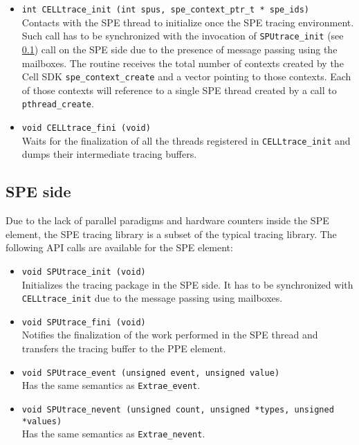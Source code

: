 \begin{itemize}

 \item {\tt int  CELLtrace\_init (int spus, spe\_context\_ptr\_t * spe\_ids)}\\
 Contacts with the SPE thread to initialize once the SPE tracing environment. Such call has to be synchronized with the invocation of {\tt SPUtrace\_init} (see \ref{subsec:SPEside}) call on the SPE side due to the presence of message passing using the mailboxes. The routine receives the total number of contexts created by the Cell SDK {\tt spe\_context\_create} and a vector pointing to those contexts. Each of those contexts will reference to a single SPE thread created by a call to {\tt pthread\_create}.

 \item {\tt void CELLtrace\_fini (void)}\\
 Waits for the finalization of all the threads registered in {\tt CELLtrace\_init} and dumps their intermediate tracing buffers.

\end{itemize}

\subsection{SPE side}\label{subsec:SPEside}

Due to the lack of parallel paradigms and hardware counters inside the SPE element, the SPE tracing library is a subset of the typical tracing library. The following API calls are available for the SPE element:

\begin{itemize}

 \item {\tt void SPUtrace\_init (void)}\\
 Initializes the tracing package in the SPE side. It has to be synchronized with {\tt CELLtrace\_init} due to the message passing using mailboxes.

 \item {\tt void SPUtrace\_fini (void)}\\
 Notifies the finalization of the work performed in the SPE thread and transfers the tracing buffer to the PPE element.

 \item {\tt void SPUtrace\_event (unsigned event, unsigned value)}\\
 Has the same semantics as {\tt Extrae\_event}.

 \item {\tt void SPUtrace\_nevent (unsigned count, unsigned *types, unsigned *values)}\\
 Has the same semantics as {\tt Extrae\_nevent}.

\end{itemize}

